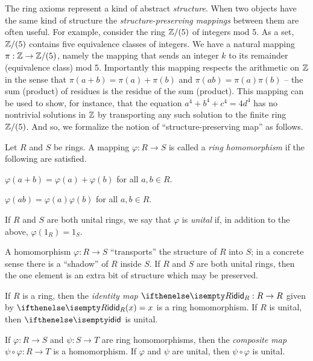 The ring axioms represent a kind of abstract \emph{structure}. When two objects have the same kind of structure the \emph{structure-preserving mappings} between them are often useful. For example, consider the ring \(\mathbb{Z}/(5)\) of integers mod 5. As a set, \(\mathbb{Z}/(5)\) contains five equivalence classes of integers. We have a natural mapping \(\pi : \mathbb{Z} \rightarrow \mathbb{Z}/(5)\), namely the mapping that sends an integer \(k\) to its remainder (equivalence class) mod 5. Importantly this mapping respects the arithmetic on \(\mathbb{Z}\) in the sense that \(\pi(a+b) = \pi(a) + \pi(b)\) and \(\pi(ab) = \pi(a)\pi(b)\) -- the sum (product) of residues is the residue of the sum (product). This mapping can be used to show, for instance, that the equation \(a^4 + b^4 + c^4 = 4d^4\) has no nontrivial solutions in \(\mathbb{Z}\) by transporting any such solution to the finite ring \(\mathbb{Z}/(5)\). And so, we formalize the notion of ``structure-preserving map'' as follows.

\begin{dfn} \label{dfn:ring-hom}
Let \(R\) and \(S\) be rings. A mapping \(\varphi : R \rightarrow S\) is called a \emph{ring homomorphism} if the following are satisfied. 
\begin{proplist}
\item \(\varphi(a + b) = \varphi(a) + \varphi(b)\) for all \(a,b \in R\).
\item \(\varphi(ab) = \varphi(a)\varphi(b)\) for all \(a,b \in R\).
\end{proplist}
If \(R\) and \(S\) are both unital rings, we say that \(\varphi\) is \emph{unital} if, in addition to the above, \(\varphi(1_R) = 1_S\). 
\end{dfn}

A homomorphism \(\varphi : R \rightarrow S\) ``transports'' the structure of \(R\) into \(S\); in a concrete sense there is a ``shadow'' of \(R\) inside \(S\). If \(R\) and \(S\) are both unital rings, then the one element is an extra bit of structure which may be preserved.

\begin{prop} \mbox{} \label{prop:ring-cat}
\begin{proplist}
\item If \(R\) is a ring, then the \emph{identity map} \(\ID[R] : R \rightarrow R\) given by \(\ID[R](x) = x\) is a ring homomorphism. If \(R\) is unital, then \(\ID\) is unital. \label{prop:ring-cat:id}
\item If \(\varphi : R \rightarrow S\) and \(\psi : S \rightarrow T\) are ring homomorphisms, then the \emph{composite map} \(\psi \circ \varphi : R \rightarrow T\) is a homomorphism. If \(\varphi\) and \(\psi\) are unital, then \(\psi \circ \varphi\) is unital. \label{prop:ring-cat:comp}
\end{proplist}
\end{prop}

